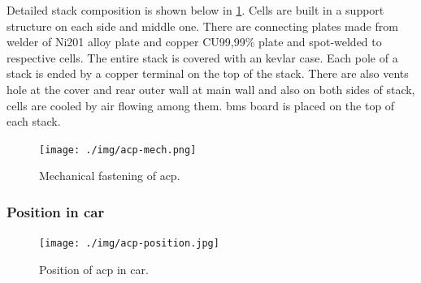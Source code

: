 Detailed stack composition is shown below in \ref{fig:acp-mech}. Cells are built in a support structure on each side and middle one. There are connecting plates made from welder of Ni201 alloy plate and copper CU99,99\% plate and spot-welded to respective cells. The entire stack is covered with an kevlar case. Each pole of a stack is ended by a copper terminal on the top of the stack. There are also vents hole at the cover and rear outer wall at main wall and also on both sides of stack, cells are cooled by air flowing among them. \gls{bms} board is placed on the top of each stack.

\begin{figure}[H]
	\centering
	\texttt{[image: ./img/acp-mech.png]}
	\caption{Mechanical fastening of \gls{acp}.}
	\label{fig:acp-mech}
\end{figure}

\subsubsection{Position in car}

\begin{figure}[H]
	\centering
	\texttt{[image: ./img/acp-position.jpg]}
	\caption{Position of \gls{acp} in car.}
	\label{fig:ACP-position}
\end{figure}

